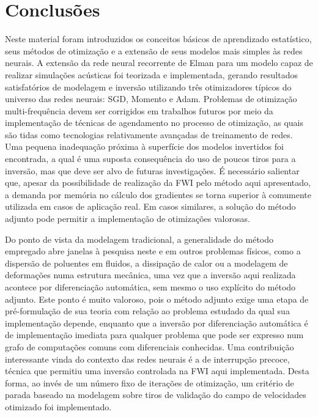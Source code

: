  
\chapter{Conclusões}

  Neste material foram introduzidos os conceitos básicos de aprendizado estatístico, seus métodos de otimização e a extensão de seus modelos mais simples às redes neurais. A extensão da rede neural recorrente de Elman para um modelo capaz de realizar simulações acústicas foi teorizada e implementada, gerando resultados satisfatórios de modelagem e inversão utilizando três otimizadores típicos do universo das redes neurais: SGD, Momento e Adam. Problemas de otimização multi-frequência devem ser corrigidos em trabalhos futuros por meio da implementação de técnicas de agendamento no processo de otimização, as quais são tidas como tecnologias relativamente avançadas de treinamento de redes. Uma pequena inadequação próxima à superfície dos modelos invertidos foi encontrada, a qual é uma suposta consequência do uso de poucos tiros para a inversão, mas que deve ser alvo de futuras investigações. É necessário salientar que, apesar da possibilidade de realização da FWI pelo método aqui apresentado, a demanda por memória no cálculo dos gradientes se torna superior à comumente utilizada em casos de aplicação real. Em casos similares, a solução do método adjunto pode permitir a implementação de otimizações valorosas.

  Do ponto de vista da modelagem tradicional, a generalidade do método empregado abre janelas à pesquisa neste e em outros problemas físicos, como a dispersão de poluentes em fluidos, a dissipação de calor ou a modelagem de deformações numa estrutura mecânica, uma vez que a inversão aqui realizada acontece por diferenciação automática, sem mesmo o uso explícito do método adjunto. Este ponto é muito valoroso, pois o método adjunto exige uma etapa de pré-formulação de sua teoria com relação ao problema estudado da qual sua implementação depende, enquanto que a inversão por diferenciação automática é de implementação imediata para qualquer problema que pode ser expresso num grafo de computações comuns com diferenciais conhecidas. Uma contribuição interessante vinda do contexto das redes neurais é a de interrupção precoce, técnica que permitiu uma inversão controlada na FWI aqui implementada. Desta forma, ao invés de um número fixo de iterações de otimização, um critério de parada baseado na modelagem sobre tiros de validação do campo de velocidades otimizado foi implementado.

